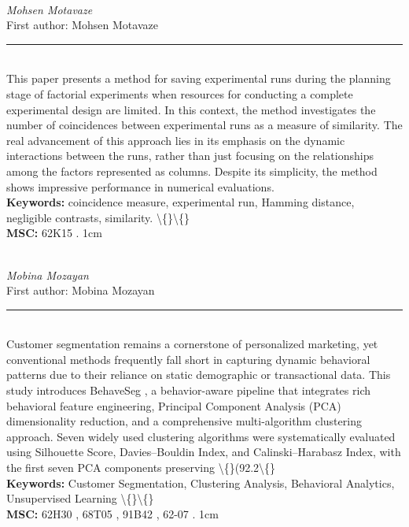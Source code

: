\documentclass[10pt,twoside]{article}
\begin{document}
\noindent\begin{minipage}[t][\textheight]{\textwidth}
\\[0.35em]
{\itshape Mohsen Motavaze}\\[0.2em]
{\footnotesize First author: Mohsen Motavaze}\\[0.45em]
\noindent\rule{\textwidth}{0.3pt}\\[0.4em]
{\footnotesize  This paper presents a method for saving experimental runs during the planning stage of factorial experiments when resources for conducting a complete experimental design are limited. In this context, the method investigates the number of coincidences between experimental runs as a measure of similarity. The real advancement of this approach lies in its emphasis on the dynamic interactions between the runs, rather than just focusing on the relationships among the factors represented as columns. Despite its simplicity, the method shows impressive performance in numerical evaluations.}\\[0.4em]
{\footnotesize\bfseries Keywords:} {\footnotesize coincidence measure, experimental run, Hamming distance, negligible contrasts, similarity. \textbackslash\{\}\textbackslash\{\}}\\[0.15em]
{\footnotesize\bfseries MSC:} {\footnotesize 62K15 . 1cm}\\
\vfill
\end{minipage}
\newpage

\noindent\begin{minipage}[t][\textheight]{\textwidth}
\\[0.35em]
{\itshape Mobina Mozayan}\\[0.2em]
{\footnotesize First author: Mobina Mozayan}\\[0.45em]
\noindent\rule{\textwidth}{0.3pt}\\[0.4em]
{\footnotesize  Customer segmentation remains a cornerstone of personalized marketing, yet conventional methods frequently fall short in capturing dynamic behavioral patterns due to their reliance on static demographic or transactional data. This study introduces BehaveSeg , a behavior-aware pipeline that integrates rich behavioral feature engineering, Principal Component Analysis (PCA) dimensionality reduction, and a comprehensive multi-algorithm clustering approach. Seven widely used clustering algorithms were systematically evaluated using Silhouette Score, Davies--Bouldin Index, and Calinski--Harabasz Index, with the first seven PCA components preserving \textbackslash\{\}(92.2\textbackslash\{\}}\\[0.4em]
{\footnotesize\bfseries Keywords:} {\footnotesize Customer Segmentation, Clustering Analysis, Behavioral Analytics, Unsupervised Learning \textbackslash\{\}\textbackslash\{\}}\\[0.15em]
{\footnotesize\bfseries MSC:} {\footnotesize 62H30 , 68T05 , 91B42 , 62-07 . 1cm}\\
\vfill
\end{minipage}
\newpage
\end{document}
